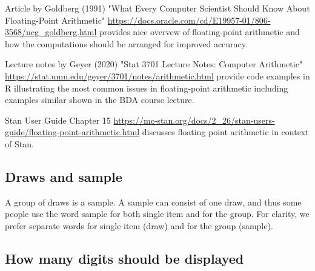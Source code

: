 \documentclass[a4paper,11pt,english]{article}
\begin{document}
Article by Goldberg (1991) "What Every Computer Scientist Should Know About Floating-Point Arithmetic" \url{https://docs.oracle.com/cd/E19957-01/806-3568/ncg_goldberg.html} provides nice overvew of floating-point arithmetic and how the computations should be arranged for improved accuracy.

Lecture notes by Geyer (2020) "Stat 3701 Lecture Notes: Computer Arithmetic" \url{https://stat.umn.edu/geyer/3701/notes/arithmetic.html} provide code examples in R illustrating the most common issues in floating-point arithmetic including examples similar shown in the BDA course lecture.

Stan User Guide Chapter 15 \url{https://mc-stan.org/docs/2_26/stan-users-guide/floating-point-arithmetic.html} discusses floating point arithmetic in context of Stan.

 \subsection*{Draws and sample}

 A group of draws is a sample. A sample can consist of one draw, and
 thus some people use the word sample for both single item and for the
 group. For clarity, we prefer separate words for single item (draw)
 and for the group (sample).
 
  \subsection*{How many digits should be displayed}
\end{document}
